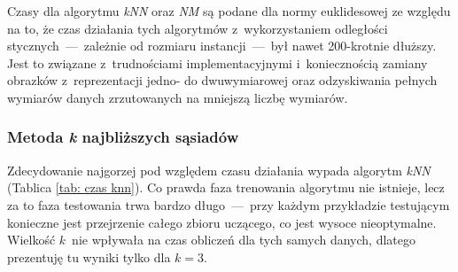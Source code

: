 \documentclass[12pt]{article}
\begin{document}
Czasy dla algorytmu \emph{kNN} oraz \emph{NM} są podane dla normy euklidesowej ze względu na to, że czas działania tych algorytmów z~wykorzystaniem odległości stycznych~---~zależnie od rozmiaru instancji~---~był nawet 200-krotnie dłuższy. 
Jest to związane z~trudnościami implementacyjnymi i~koniecznością zamiany obrazków z~reprezentacji jedno- do dwuwymiarowej oraz odzyskiwania pełnych wymiarów danych zrzutowanych na mniejszą liczbę wymiarów.

\subsubsection{Metoda \emph{k} najbliższych sąsiadów}
Zdecydowanie najgorzej pod względem czasu działania wypada algorytm \emph{kNN} (Tablica \ref{tab: czas knn}). Co prawda faza trenowania algorytmu nie istnieje, lecz za to faza testowania trwa bardzo długo~---~przy każdym przykładzie
 testującym konieczne jest przejrzenie całego zbioru uczącego, co jest wysoce nieoptymalne. Wielkość $k$~nie wpływała na czas obliczeń dla tych samych danych, dlatego prezentuję tu wyniki tylko dla $k=3$.
\end{document}
